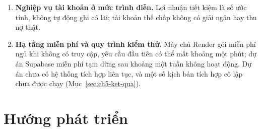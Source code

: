 \begin{enumerate}
	\item \textbf{Nghiệp vụ tài khoản ở mức trình diễn.} Lợi nhuận tiết kiệm là số ước tính, không tự động ghi có lãi; tài khoản thế chấp không có giải ngân hay thu nợ thật.
	\item \textbf{Hạ tầng miễn phí và quy trình kiểm thử.} Máy chủ Render gói miễn phí ngủ khi không có truy cập, yêu cầu đầu tiên có thể mất khoảng một phút; dự án Supabase miễn phí tạm dừng sau khoảng một tuần không hoạt động. Dự án chưa có hệ thống tích hợp liên tục, và một số kịch bản tích hợp cô lập chưa được chạy (Mục~\ref{sec:ch5-ket-qua}).
\end{enumerate}

\section{Hướng phát triển}
\label{sec:ch5-huong-phat-trien}


